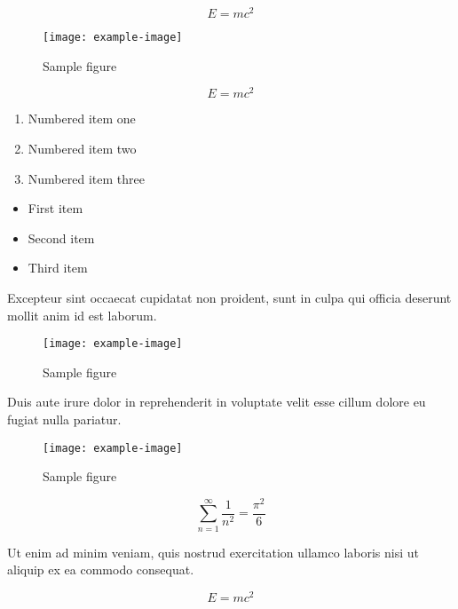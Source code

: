 \documentclass{article}
\begin{document}
\begin{equation}
    E = mc^2
\end{equation}

\begin{figure}[h]
    \centering
    \texttt{[image: example-image]}
    \caption{Sample figure}
    \label{fig:sample}
\end{figure}

\begin{equation}
    E = mc^2
\end{equation}

\begin{enumerate}
\item Numbered item one
\item Numbered item two
\item Numbered item three
\end{enumerate}

\begin{itemize}
\item First item
\item Second item
\item Third item
\end{itemize}

Excepteur sint occaecat cupidatat non proident, sunt in culpa qui officia deserunt mollit anim id est laborum.

\begin{figure}[h]
    \centering
    \texttt{[image: example-image]}
    \caption{Sample figure}
    \label{fig:sample}
\end{figure}

Duis aute irure dolor in reprehenderit in voluptate velit esse cillum dolore eu fugiat nulla pariatur.

\begin{figure}[h]
    \centering
    \texttt{[image: example-image]}
    \caption{Sample figure}
    \label{fig:sample}
\end{figure}

\begin{equation}
    \sum_{n=1}^{\infty} \frac{1}{n^2} = \frac{\pi^2}{6}
\end{equation}

Ut enim ad minim veniam, quis nostrud exercitation ullamco laboris nisi ut aliquip ex ea commodo consequat.

\begin{equation}
    E = mc^2
\end{equation}
\end{document}
